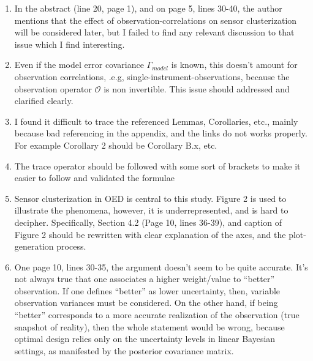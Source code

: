 \documentclass{amsart}
\numberwithin{equation}{section}
\begin{document}
\begin{enumerate}
\item In the abstract (line 20, page 1), and on page 5, lines 30-40, the
  author mentions that the effect of observation-correlations on sensor
  clusterization will be considered later, but I failed to find any
  relevant discussion to that issue which I find interesting.
  

  \item Even if the model error covariance $\Gamma_{model}$ is known,
  this doesn't amount for observation correlations, .e.g,
  single-instrument-observations, because the observation operator
  $\mathcal{O}$ is non invertible. This issue should addressed and
  clarified clearly.

  \item I found it difficult to trace the referenced Lemmas,
    Corollaries, etc., mainly because bad referencing in the appendix,
    and the links do not works properly.  For example Corollary 2
    should be Corollary B.x, etc.

    
  \item The trace operator should be followed with some sort of brackets to
    make it easier to follow and validated the formulae
    

  \item Sensor clusterization in OED is central to this study. Figure
    2 is used to illustrate the phenomena, however, it is
    underrepresented, and is hard to decipher. Specifically, Section
    4.2 (Page 10, lines 36-39), and caption of Figure 2 should be
    rewritten with clear explanation of the axes, and the
    plot-generation process.


    \item One page 10, lines 30-35, the argument doesn't seem to be
      quite accurate. It's not always true that one associates a
      higher weight/value to ``better'' observation. If one defines
      ``better'' as lower uncertainty, then, variable observation
      variances must be considered. On the other hand, if being
      ``better'' corresponds to a more accurate realization of the
      observation (true snapshot of reality), then the whole statement
      would be wrong, because optimal design relies only on the
      uncertainty levels in linear Bayesian settings, as manifested by
      the posterior covariance matrix.


\end{enumerate}
\end{document}
